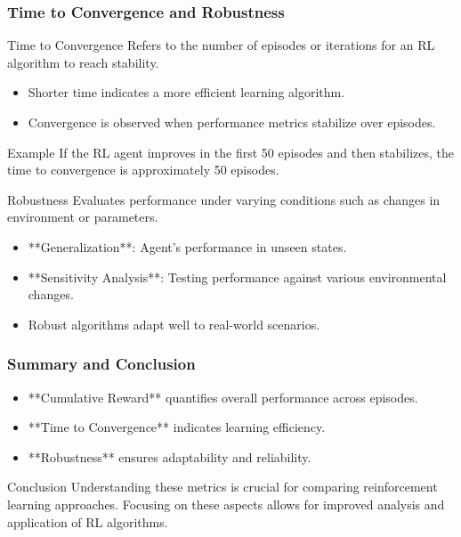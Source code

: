 \documentclass[aspectratio=169]{beamer}
\begin{document}
\begin{frame}[fragile]
    \frametitle{Time to Convergence and Robustness}
    \begin{block}{Time to Convergence}
        Refers to the number of episodes or iterations for an RL algorithm to reach stability.
    \end{block}

    \begin{itemize}
        \item Shorter time indicates a more efficient learning algorithm.
        \item Convergence is observed when performance metrics stabilize over episodes.
    \end{itemize}

    \begin{exampleblock}{Example}
        If the RL agent improves in the first 50 episodes and then stabilizes, the time to convergence is approximately 50 episodes.
    \end{exampleblock}

    \begin{block}{Robustness}
        Evaluates performance under varying conditions such as changes in environment or parameters.
    \end{block}

    \begin{itemize}
        \item **Generalization**: Agent's performance in unseen states.
        \item **Sensitivity Analysis**: Testing performance against various environmental changes.
    \end{itemize}

    \begin{itemize}
        \item Robust algorithms adapt well to real-world scenarios.
    \end{itemize}
\end{frame}

\begin{frame}[fragile]
    \frametitle{Summary and Conclusion}
    \begin{itemize}
        \item **Cumulative Reward** quantifies overall performance across episodes.
        \item **Time to Convergence** indicates learning efficiency.
        \item **Robustness** ensures adaptability and reliability.
    \end{itemize}

    \begin{block}{Conclusion}
        Understanding these metrics is crucial for comparing reinforcement learning approaches. Focusing on these aspects allows for improved analysis and application of RL algorithms.
    \end{block}
\end{frame}
\end{document}
